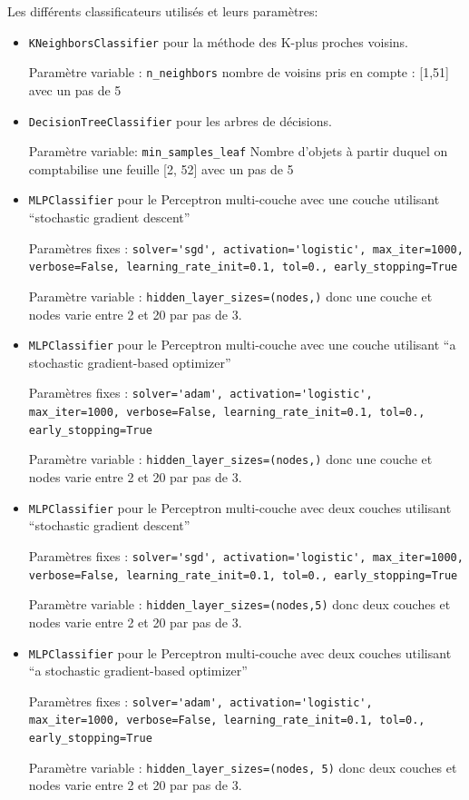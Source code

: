 \documentclass[a4paper,10pt]{article}
\begin{document}
    Les différents classificateurs utilisés et leurs paramètres:
    \begin{itemize}
        \item \verb?KNeighborsClassifier? pour la méthode des K-plus proches voisins.
        
        Paramètre variable : \verb?n_neighbors? nombre de voisins pris en compte : [1,51] avec un pas de 5
        \item \verb?DecisionTreeClassifier? pour les arbres de décisions. 
        
        Paramètre variable: \verb?min_samples_leaf? Nombre d'objets à partir duquel on comptabilise une feuille [2, 52] avec un pas de 5
        \item \verb?MLPClassifier? pour le Perceptron multi-couche avec une couche utilisant ``stochastic gradient descent''
        
        Paramètres fixes : \verb?solver='sgd', activation='logistic', max_iter=1000, verbose=False, learning_rate_init=0.1, tol=0., early_stopping=True?
        
        Paramètre variable : \verb?hidden_layer_sizes=(nodes,)? donc une couche et nodes varie entre 2 et 20 par pas de 3.
        \item \verb?MLPClassifier? pour le Perceptron multi-couche avec une couche utilisant ``a stochastic gradient-based optimizer''
        
        Paramètres fixes : \verb?solver='adam', activation='logistic', max_iter=1000, verbose=False, learning_rate_init=0.1, tol=0., early_stopping=True?
        
        Paramètre variable : \verb?hidden_layer_sizes=(nodes,)? donc une couche et nodes varie entre 2 et 20 par pas de 3.  
        \item \verb?MLPClassifier? pour le Perceptron multi-couche avec deux couches utilisant ``stochastic gradient descent''
        
        Paramètres fixes : \verb?solver='sgd', activation='logistic', max_iter=1000, verbose=False, learning_rate_init=0.1, tol=0., early_stopping=True?
        
        Paramètre variable : \verb?hidden_layer_sizes=(nodes,5)? donc deux couches et nodes varie entre 2 et 20 par pas de 3.
        \item \verb?MLPClassifier? pour le Perceptron multi-couche avec deux couches utilisant ``a stochastic gradient-based optimizer''
        
        Paramètres fixes : \verb?solver='adam', activation='logistic', max_iter=1000, verbose=False, learning_rate_init=0.1, tol=0., early_stopping=True?
        
        Paramètre variable : \verb?hidden_layer_sizes=(nodes, 5)? donc deux couches et nodes varie entre 2 et 20 par pas de 3.
    \end{itemize}
    
\end{document}
